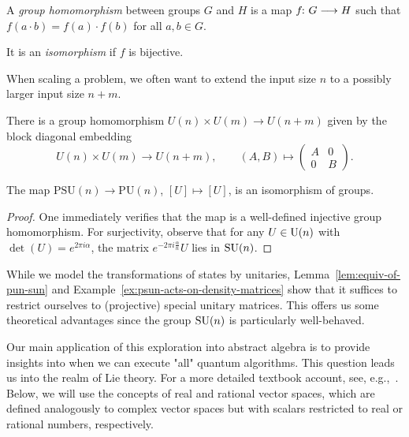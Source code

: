 \documentclass[a4paper, oneside, 12pt]{amsart}
\begin{document}
\begin{definition}\label{def:group-homomorphism}
  A \emph{group homomorphism} between groups \( G \) and \( H \) is a map \( f \from G \to H \) such that \(f(a \cdot b) = f(a) \cdot f(b)\) for all \( a, b \in G \).

  It is an \emph{isomorphism} if \(f\) is bijective.
\end{definition}

When scaling a problem, we often want to extend the input size \( n \) to a possibly larger input size \( n + m \).

\begin{example}\label{ex:tensor-product-of-unitary-groups}
  There is a group homomorphism \( U(n) \times U(m) \to U(n + m) \) given by the block diagonal embedding
  \begin{equation*}
    U(n) \times U(m) \to U(n + m), \qquad
    (A, B) \mapsto \begin{pmatrix}
      A & 0 \\
      0 & B
    \end{pmatrix}.
  \end{equation*}
\end{example}

\begin{lemma}\label{lem:equiv-of-pun-sun}
  The map \( \mathrm{PSU}(n) \to \mathrm{PU}(n) \), \([U] \mapsto [U]\), is an isomorphism of groups.
\end{lemma}

\begin{proof}
  One immediately verifies that the map is a well-defined injective group homomorphism.
  For surjectivity, observe that for any \( U \in \operatorname{U}(n) \) with \( \det(U) = e^{2\pi i \alpha} \), the matrix \( e^{-2\pi i \tfrac{\alpha}{n}} U \) lies in \( \operatorname{SU}(n) \).
\end{proof}

\begin{remark}\label{rmk:reducing-action-to-special-unitary}
  While we  model the transformations of states by unitaries, Lemma~\ref{lem:equiv-of-pun-sun} and Example~\ref{ex:psun-acts-on-density-matrices} show that it suffices to restrict ourselves
  to (projective) special unitary matrices.
  This offers us some theoretical advantages since the group \(\operatorname{SU}(n)\) is particularly well-behaved.
\end{remark}

Our main application of this exploration into abstract algebra is to provide insights into when we can execute "all" quantum algorithms.
This question leads us into the realm of Lie theory.
For a more detailed textbook account, see, e.g.,~\cite{hall2015:LieGroupsLieAlgebrasRepresentations}.
Below, we will use the concepts of real and rational vector spaces, which are defined analogously to complex vector spaces but with scalars restricted to real or rational numbers, respectively.
\bigskip
\end{document}
